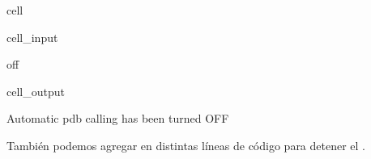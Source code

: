 \documentclass[letterpaper,10pt,english]{jupyterBook}
\begin{document}
\begin{sphinxuseclass}{cell}\begin{sphinxVerbatimInput}

\begin{sphinxuseclass}{cell_input}
\begin{sphinxVerbatim}[commandchars=\\\{\}]
 off
\end{sphinxVerbatim}

\end{sphinxuseclass}\end{sphinxVerbatimInput}
\begin{sphinxVerbatimOutput}

\begin{sphinxuseclass}{cell_output}
\begin{sphinxVerbatim}[commandchars=\\\{\}]
Automatic pdb calling has been turned OFF
\end{sphinxVerbatim}

\end{sphinxuseclass}\end{sphinxVerbatimOutput}

\end{sphinxuseclass}
\sphinxAtStartPar
También podemos agregar  en distintas líneas de código para detener el .
\end{document}
